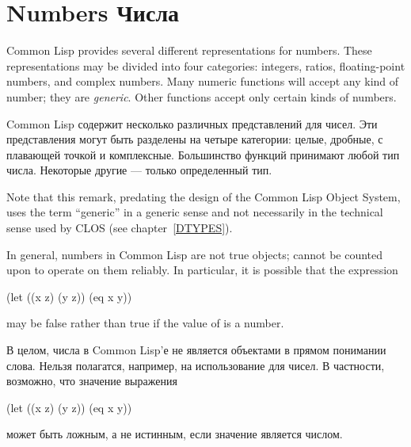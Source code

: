 
\clearpage\def\pagestatus{FINAL PROOF}

\begingroup
\def\arcsinh{\mathop\textrm{arcsinh}\nolimits}
\def\arccosh{\mathop\textrm{arccosh}\nolimits}
\def\arctanh{\mathop\textrm{arctanh}\nolimits}
\def\cis{\mathop\textrm{cis}\nolimits}
\def\phase{\mathop\textrm{phase}\nolimits}

\chapter{Numbers Числа}
\label{NUMBER}


Common Lisp provides several different representations for numbers.
These representations may be divided into four categories: integers,
ratios, floating-point numbers, and complex numbers.  Many numeric
functions will accept any kind of number; they are \emph{generic}.  Other
functions accept only certain kinds of numbers.

Common Lisp содержит несколько различных представлений для чисел.
Эти представления могут быть разделены на четыре категории: целые, дробные, с
плавающей точкой и комплексные. Большинство функций принимают любой тип
числа. Некоторые другие --- только определенный тип.

\begin{new}
Note that this remark, predating the design of the Common Lisp Object System,
uses the term ``generic'' in a generic sense and not necessarily
in the technical sense used by CLOS
(see chapter~\ref{DTYPES}).
\end{new}

In general, numbers in Common Lisp are not true objects;  cannot
be counted upon to operate on them reliably.  In particular,
it is possible that the expression
\begin{lisp}
(let ((x z) (y z)) (eq x y))
\end{lisp}
may be false rather than true if the value of  is a number.

В целом, числа в Common Lisp'е не является объектами в прямом понимании
слова. Нельзя полагатся, например, на использование  для чисел. В
частности, возможно, что значение выражения
\begin{lisp}
(let ((x z) (y z)) (eq x y))
\end{lisp}
может быть ложным, а не истинным, если значение  является числом.

